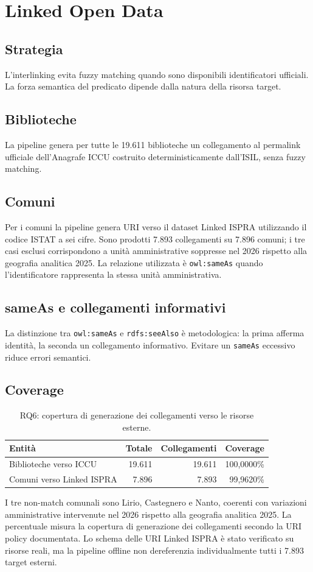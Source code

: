 \documentclass[11pt,a4paper]{article}
\begin{document}
\section{Linked Open Data}
\subsection{Strategia}
L'interlinking evita fuzzy matching quando sono disponibili identificatori ufficiali. La forza semantica del predicato dipende dalla natura della risorsa target.

\subsection{Biblioteche}
La pipeline genera per tutte le 19.611 biblioteche un collegamento al permalink ufficiale dell'Anagrafe ICCU costruito deterministicamente dall'ISIL, senza fuzzy matching.

\subsection{Comuni}
Per i comuni la pipeline genera URI verso il dataset Linked ISPRA utilizzando il codice ISTAT a sei cifre. Sono prodotti 7.893 collegamenti su 7.896 comuni; i tre casi esclusi corrispondono a unità amministrative soppresse nel 2026 rispetto alla geografia analitica 2025. La relazione utilizzata è \texttt{owl:sameAs} quando l'identificatore rappresenta la stessa unità amministrativa.

\subsection{sameAs e collegamenti informativi}
La distinzione tra \texttt{owl:sameAs} e \texttt{rdfs:seeAlso} è metodologica: la prima afferma identità, la seconda un collegamento informativo. Evitare un \texttt{sameAs} eccessivo riduce errori semantici.

\subsection{Coverage}
\begin{table}[H]
\centering
\begin{tabular}{lrrr}
\toprule
Entità & Totale & Collegamenti & Coverage \\
\midrule
Biblioteche verso ICCU & 19.611 & 19.611 & 100,0000\% \\
Comuni verso Linked ISPRA & 7.896 & 7.893 & 99,9620\% \\
\bottomrule
\end{tabular}
\caption{RQ6: copertura di generazione dei collegamenti verso le risorse esterne.}
\end{table}
I tre non-match comunali sono Lirio, Castegnero e Nanto, coerenti con variazioni amministrative intervenute nel 2026 rispetto alla geografia analitica 2025.
La percentuale misura la copertura di generazione dei collegamenti secondo la URI policy documentata. Lo schema delle URI Linked ISPRA è stato verificato su risorse reali, ma la pipeline offline non dereferenzia individualmente tutti i 7.893 target esterni.
\end{document}
